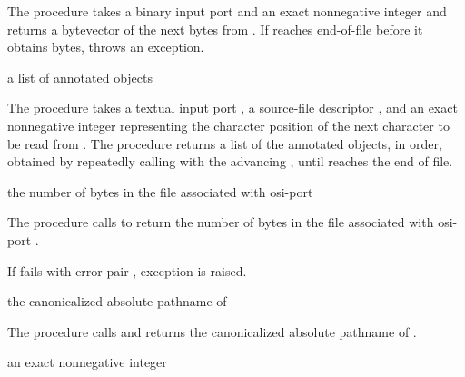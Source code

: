 The  procedure takes a binary input
port  and an exact nonnegative integer  and
returns a bytevector of the next  bytes from .
If  reaches end-of-file before it obtains  bytes,
 throws an 
exception.

\begin{procedure}
\end{procedure}
\returns{} a list of annotated objects

The  procedure takes a textual input
port , a source-file descriptor , and an exact
nonnegative integer  representing the character position of
the next character to be read from . The procedure returns a
list of the annotated objects, in order, obtained by repeatedly
calling  with the advancing ,
until  reaches the end of file.

\begin{procedure}
\end{procedure}
\returns{} the number of bytes in the file associated with osi-port 

The  procedure calls 
to return the number of bytes in the file associated with osi-port
.

If  fails with error pair , exception  is raised.

\begin{procedure}
\end{procedure}
\returns{} the canonicalized absolute pathname of 

The  procedure calls 
and returns the canonicalized absolute pathname of .

\begin{procedure}
\end{procedure}
\returns{} an exact nonnegative integer

